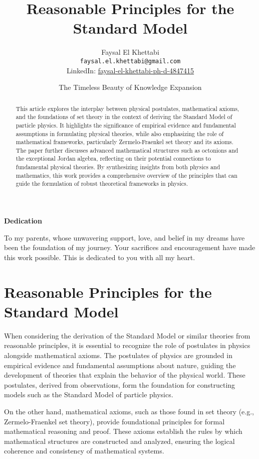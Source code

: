 \documentclass{article}
\title{Reasonable Principles for the Standard Model}
\author{Faysal El Khettabi \\
\texttt{faysal.el.khettabi@gmail.com} \\
LinkedIn: \href{https://www.linkedin.com/in/faysal-el-khettabi-ph-d-4847415/}{faysal-el-khettabi-ph-d-4847415}}
\date{The Timeless Beauty of Knowledge Expansion}
\begin{document}
\maketitle

\begin{center}
    \textbf{Dedication}
\end{center}

To my parents, whose unwavering support, love, and belief in my dreams have been the foundation of my journey. Your sacrifices and encouragement have made this work possible. This is dedicated to you with all my heart.

\begin{abstract}
This article explores the interplay between physical postulates, mathematical axioms, and the foundations of set theory in the context of deriving the Standard Model of particle physics. It highlights the significance of empirical evidence and fundamental assumptions in formulating physical theories, while also emphasizing the role of mathematical frameworks, particularly Zermelo-Fraenkel set theory and its axioms. The paper further discusses advanced mathematical structures such as octonions and the exceptional Jordan algebra, reflecting on their potential connections to fundamental physical theories. By synthesizing insights from both physics and mathematics, this work provides a comprehensive overview of the principles that can guide the formulation of robust theoretical frameworks in physics.
\end{abstract}

\section{Reasonable Principles for the Standard Model}

When considering the derivation of the Standard Model or similar theories from reasonable principles, it is essential to recognize the role of postulates in physics alongside mathematical axioms. The postulates of physics are grounded in empirical evidence and fundamental assumptions about nature, guiding the development of theories that explain the behavior of the physical world. These postulates, derived from observations, form the foundation for constructing models such as the Standard Model of particle physics.

On the other hand, mathematical axioms, such as those found in set theory (e.g., Zermelo-Fraenkel set theory), provide foundational principles for formal mathematical reasoning and proof. These axioms establish the rules by which mathematical structures are constructed and analyzed, ensuring the logical coherence and consistency of mathematical systems.
\end{document}
